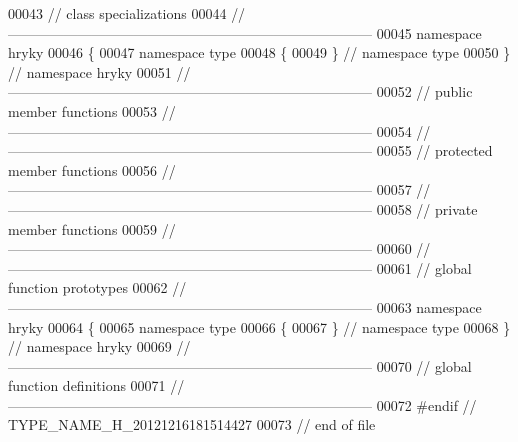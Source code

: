 \begin{DoxyCode}
00043 \textcolor{comment}{// class specializations}
00044 \textcolor{comment}{//
      ------------------------------------------------------------------------------}
00045 \textcolor{keyword}{namespace }hryky
00046 \{
00047 \textcolor{keyword}{namespace }type
00048 \{
00049 \} \textcolor{comment}{// namespace type}
00050 \} \textcolor{comment}{// namespace hryky}
00051 \textcolor{comment}{//
      ------------------------------------------------------------------------------}
00052 \textcolor{comment}{// public member functions}
00053 \textcolor{comment}{//
      ------------------------------------------------------------------------------}
00054 \textcolor{comment}{//
      ------------------------------------------------------------------------------}
00055 \textcolor{comment}{// protected member functions}
00056 \textcolor{comment}{//
      ------------------------------------------------------------------------------}
00057 \textcolor{comment}{//
      ------------------------------------------------------------------------------}
00058 \textcolor{comment}{// private member functions}
00059 \textcolor{comment}{//
      ------------------------------------------------------------------------------}
00060 \textcolor{comment}{//
      ------------------------------------------------------------------------------}
00061 \textcolor{comment}{// global function prototypes}
00062 \textcolor{comment}{//
      ------------------------------------------------------------------------------}
00063 \textcolor{keyword}{namespace }hryky
00064 \{
00065 \textcolor{keyword}{namespace }type
00066 \{
00067 \} \textcolor{comment}{// namespace type}
00068 \} \textcolor{comment}{// namespace hryky}
00069 \textcolor{comment}{//
      ------------------------------------------------------------------------------}
00070 \textcolor{comment}{// global function definitions}
00071 \textcolor{comment}{//
      ------------------------------------------------------------------------------}
00072 \textcolor{preprocessor}{#endif // TYPE\_NAME\_H\_20121216181514427}
00073 \textcolor{preprocessor}{}\textcolor{comment}{// end of file}
\end{DoxyCode}
